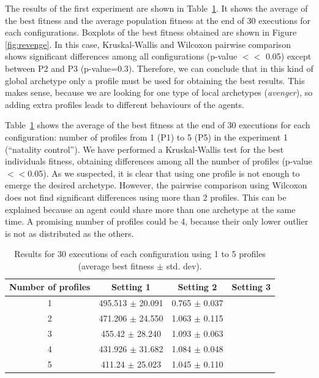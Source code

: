 \documentclass[letterpaper]{article}
\begin{document}
The results of the first experiment are shown in
Table~\ref{tab:results}. It shows the average of the best fitness
and the average population fitness at the end of 30 executions for
each configurations. Boxplots of the best fitness obtained are shown
in Figure \ref{fig:revenge}. In this case, Kruskal-Wallis and Wilcoxon
pairwise comparison shows significant differences among all
configurations (p-value $<<$ 0.05) except between P2 and P3
(p-value=0.3). Therefore, we can conclude that in this kind of global
archetype only a profile must be used for obtaining the best
results. This makes sense, because we are looking for one type of
local archetypes ({\em avenger}), so adding extra profiles leads to
different behaviours of the agents. 

Table~\ref{tab:results} shows the average of the best fitness at the end of 30 executions for each configuration: number of profiles from 1 (P1) to 5 (P5) in the experiment 1 (``natality control'').
We have performed a Kruskal-Wallis test for the best individuals fitness, obtaining differences among all the number of profiles (p-value $<<$0.05). As we suspected, it is clear that using one profile is not enough to emerge the desired archetype. However, the pairwise comparison using Wilcoxon does not find significant differences using more than 2 profiles. This can be explained because an agent could share more than one archetype at the same time.  A promising number of profiles could be 4, because their only lower outlier is not as distributed as the others. %

\begin{table}
\begin{center}
\begin{tabular}{|c|c|c|c|}
\hline
Number of profiles& Setting 1 & Setting 2 & Setting 3\\
\hline\hline
1 & 495.513 $\pm$ 20.091 & 0.765 $\pm$ 0.037\\
2 & 471.206 $\pm$ 24.550 & 1.063 $\pm$ 0.115 \\
3 & 455.42 $\pm$ 28.240 & 1.093 $\pm$ 0.063 \\
4 & 431.926 $\pm$ 31.682 & 1.084 $\pm$ 0.048 \\
5 & 411.24 $\pm$ 25.023 & 1.045 $\pm$ 0.110 \\
\hline
\end{tabular}
\end{center}
\vskip 0.25cm
\caption{Results for 30 executions of each configuration using 1 to 5 profiles (average best fitness $\pm$ std. dev).}
\label{tab:results}
\end{table}
\end{document}
